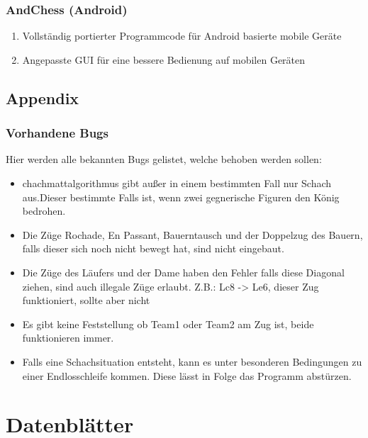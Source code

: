 \documentclass[12pt,a4paper]{article}
\begin{document}
{\subsubsection{AndChess (Android)}

\begin{enumerate}
	\item{Vollständig portierter Programmcode für Android basierte mobile Geräte}
	\item{Angepasste GUI für eine bessere Bedienung auf mobilen Geräten}
\end{enumerate}

\subsection{Appendix}
\subsubsection{Vorhandene Bugs}

Hier werden alle bekannten Bugs gelistet, welche behoben werden sollen:

\begin{itemize}
	\item{chachmattalgorithmus gibt außer in einem bestimmten Fall nur Schach aus.Dieser bestimmte Falls ist, wenn zwei gegnerische Figuren den König bedrohen.}
	\item{Die Züge Rochade, En Passant, Bauerntausch und der Doppelzug des Bauern, falls dieser sich noch nicht bewegt hat, sind nicht eingebaut.}
	\item{Die Züge des Läufers und der Dame haben den Fehler falls diese Diagonal ziehen, sind auch illegale Züge erlaubt. Z.B.: Lc8 -> Le6, dieser Zug funktioniert, sollte aber nicht}
	\item{Es gibt keine Feststellung ob Team1 oder Team2 am Zug ist, beide funktionieren immer.}
	\item{Falls eine Schachsituation entsteht, kann es unter besonderen Bedingungen zu einer Endlosschleife kommen. Diese lässt in Folge das Programm abstürzen.}
\end{itemize}


\section{Datenblätter}
\label{SEC:DATASHEET}



}
\end{document}
